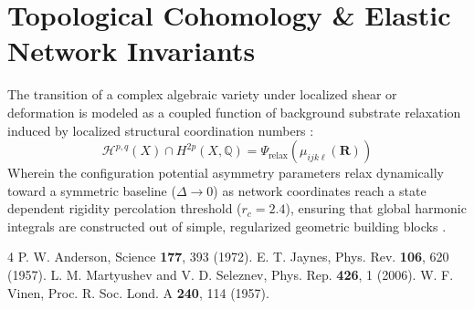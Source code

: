 \documentclass[reprint,amsmath,amssymb,aps,prd,nofootinbib]{revtex4-2}
\begin{document}
\section{Topological Cohomology \& Elastic Network Invariants}
The transition of a complex algebraic variety under localized shear or deformation is modeled as a coupled function of background substrate relaxation induced by localized structural coordination numbers \cite{vinen1957}:
\begin{equation}
\mathcal{H}^{p,q}(X) \cap H^{2p}(X, \mathbb{Q}) = \Psi_{\text{relax}}\left(\mu_{ijk\ell}(\mathbf{R})\right)
\end{equation}
Wherein the configuration potential asymmetry parameters relax dynamically toward a symmetric baseline ($\Delta \to 0$) as network coordinates reach a state dependent rigidity percolation threshold ($r_c = 2.4$), ensuring that global harmonic integrals are constructed out of simple, regularized geometric building blocks \cite{martyushev2006}.

\begin{thebibliography}{4}
 P. W. Anderson, Science {\bf 177}, 393 (1972).
 E. T. Jaynes, Phys. Rev. {\bf 106}, 620 (1957).
 L. M. Martyushev and V. D. Seleznev, Phys. Rep. {\bf 426}, 1 (2006).
 W. F. Vinen, Proc. R. Soc. Lond. A {\bf 240}, 114 (1957).
\end{thebibliography}
\end{document}
